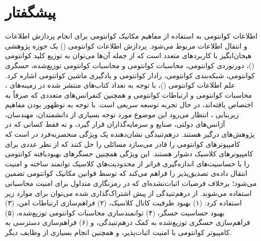 

\chapter*{پیشگفتار}
\label{chap:preface}

اطلاعات کوانتومی به استفاده از مفاهیم مکانیک کوانتومی برای انجام پردازش اطلاعات و انتقال اطلاعات مربوط می‌شود. پردازش اطلاعات کوانتومی () یک حوزه پژوهشی هیجان‌انگیز با کاربردهای متعدد است که از جمله آن‌ها می‌توان به توزیع کلید کوانتومی ()، دورنوردی کوانتومی، محاسبات کوانتومی و محاسبات کوانتومی توزیع‌شده، حسگری کوانتومی، شبکه‌بندی کوانتومی، رادار کوانتومی و یادگیری ماشین کوانتومی اشاره کرد. علم اطلاعات کوانتومی ()، با توجه به تعداد کتاب‌های منتشر شده در زمینه‌های ، محاسبات کوانتومی و ارتباطات کوانتومی و همچنین کنفرانس‌های متعددی که صرفاً به  اختصاص یافته‌اند، در حال تجربه توسعه سریعی است. با توجه به نوظهور بودن مفاهیم زیربنایی ، انتظار می‌رود این موضوع مورد توجه بسیاری از دانشمندان، مهندسان، آژانس‌های دولتی، صنایع و سرمایه‌گذاران قرار گیرد، و نه فقط کسانی که در پژوهش‌های  درگیر هستند. درهم‌تنیدگی نشان‌دهنده یک ویژگی منحصر‌به‌فرد در  است که کامپیوترهای کوانتومی را قادر می‌سازد مسائلی را حل کنند که از نظر عددی برای کامپیوترهای کلاسیک دشوار هستند. این ویژگی همچنین حسگرهای بهبودیافته کوانتومی را با حساسیت‌های اندازه‌گیری فراتر از محدودیت‌های کلاسیک توانمند ساخته و امنیت انتقال داده‌ی تصدیق‌پذیر را فراهم می‌کند که توسط قوانین مکانیک کوانتومی تضمین می‌شود؛ برخلاف فرضیات اثبات‌نشده‌ای که در رمزنگاری متداول برای امنیت محاسباتی استفاده می‌شوند. از درهم‌تنیدگی از پیش اشتراک‌گذاری شده می‌توان برای موارد زیر استفاده کرد: (۱) بهبود ظرفیت کانال کلاسیک، (۲) فراهم‌سازی ارتباطات امن، (۳) بهبود حساسیت حسگر، (۴) توانمندسازی محاسبات کوانتومی توزیع‌شده، (۵) فراهم‌سازی حسگری توزیع‌شده به کمک درهم‌تنیدگی، و (۶) فراهم‌سازی دسترسی به کامپیوتر کوانتومی با امنیت اثبات‌پذیر، و همچنین انجام بسیاری از وظایف دیگر.

